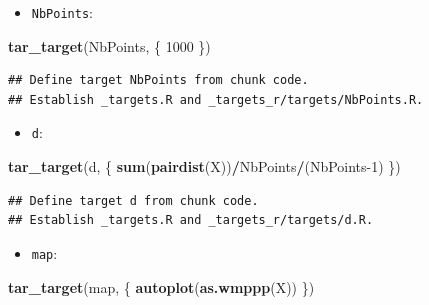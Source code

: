 \documentclass[
  12pt,
  american,
  a4paper,
  extrafontsizes,onecolumn,openright
  ]{memoir}
\newenvironment{Shaded}{\begin{snugshade}}{\end{snugshade}}
\newcommand{\DecValTok}[1]{\textcolor[rgb]{0.00,0.00,0.81}{#1}}
\newcommand{\FunctionTok}[1]{\textcolor[rgb]{0.13,0.29,0.53}{\textbf{#1}}}
\newcommand{\NormalTok}[1]{#1}
\newcommand{\SpecialCharTok}[1]{\textcolor[rgb]{0.81,0.36,0.00}{\textbf{#1}}}
\providecommand{\tightlist}{%
  \setlength{\itemsep}{0pt}\setlength{\parskip}{0pt}}
\begin{document}
\begin{itemize}
\tightlist
\item
  \texttt{NbPoints}:
\end{itemize}

\scriptsize

\begin{Shaded}
\begin{Highlighting}[]
\FunctionTok{tar\_target}\NormalTok{(NbPoints, \{}
    \DecValTok{1000}
\NormalTok{\})}
\end{Highlighting}
\end{Shaded}

\begin{verbatim}
## Define target NbPoints from chunk code.
## Establish _targets.R and _targets_r/targets/NbPoints.R.
\end{verbatim}

\normalsize

\begin{itemize}
\tightlist
\item
  \texttt{d}:
\end{itemize}

\scriptsize

\begin{Shaded}
\begin{Highlighting}[]
\FunctionTok{tar\_target}\NormalTok{(d, \{}
    \FunctionTok{sum}\NormalTok{(}\FunctionTok{pairdist}\NormalTok{(X))}\SpecialCharTok{/}\NormalTok{NbPoints}\SpecialCharTok{/}\NormalTok{(NbPoints}\DecValTok{{-}1}\NormalTok{)}
\NormalTok{\})}
\end{Highlighting}
\end{Shaded}

\begin{verbatim}
## Define target d from chunk code.
## Establish _targets.R and _targets_r/targets/d.R.
\end{verbatim}

\normalsize

\begin{itemize}
\tightlist
\item
  \texttt{map}:
\end{itemize}

\scriptsize

\begin{Shaded}
\begin{Highlighting}[]
\FunctionTok{tar\_target}\NormalTok{(map, \{}
    \FunctionTok{autoplot}\NormalTok{(}\FunctionTok{as.wmppp}\NormalTok{(X))}
\NormalTok{\})}
\end{Highlighting}
\end{Shaded}
\end{document}
